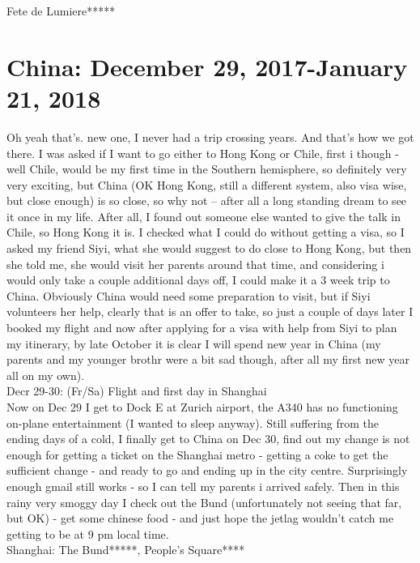 Fete de Lumiere*****

\section{China: December 29, 2017-January 21, 2018}
\label{2018:China}

Oh yeah that's. new one, I never had a trip crossing years. And that's how we got there. I was asked if I want to go either to Hong Kong or Chile, first i though - well Chile, would be my first time in the Southern hemisphere, so definitely very very exciting, but China (OK Hong Kong, still a different system, also visa wise, but close enough) is so close, so why not -- after all a long standing dream to see it once in my life. After all, I found out someone else wanted to give the talk in Chile, so Hong Kong it is. I checked what I could do without getting a visa, so I asked my friend Siyi, what she would suggest to do close to Hong Kong, but then she told me, she would visit her parents around that time, and considering i would only take a couple additional days off, I could make it a 3 week trip to China. Obviously China would need some preparation to visit, but if Siyi volunteers her help, clearly that is an offer to take, so just a couple of days later I booked my flight and now after applying for a visa with help from Siyi to plan my itinerary, by late October it is clear I will spend new year in China (my parents and my younger brothr were a bit sad though, after all my first new year all on my own). \\

Decr 29-30: (Fr/Sa) Flight and first day in Shanghai\\
Now on Dec 29 I get to Dock E at Zurich airport, the A340 has no functioning on-plane entertainment (I wanted to sleep anyway). Still suffering from the ending days of a cold, I finally get to China on Dec 30, find out my change is not enough for getting a ticket on the Shanghai metro - getting a coke to get the sufficient change - and ready to go and ending up in the city centre. Surprisingly enough gmail still works - so I can tell my parents i arrived safely. Then in this rainy very smoggy day I check out the Bund (unfortunately not seeing that far, but OK) - get some chinese food - and just hope the jetlag wouldn't catch me getting to be at 9 pm local time.\\

Shanghai: The Bund*****, People's Square****\\

